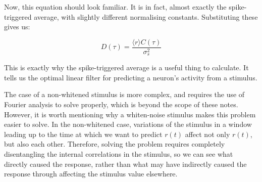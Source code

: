 \documentclass{article}
\begin{document}
Now, this equation should look familiar. It is in fact, almost exactly the spike-triggered average, with slightly different normalising constants. Substituting these gives us:

\begin{equation*}
	D(\tau) = \frac{\langle r \rangle C(\tau)}{\sigma_s^2}
\end{equation*}

This is exactly why the spike-triggered average is a useful thing to calculate. It tells us the optimal linear filter for predicting a neuron's activity from a stimulus.\\

\begin{figure}[H]
	\centering

\end{figure}

The case of a non-whitened stimulus is more complex, and requires the use of Fourier analysis to solve properly, which is beyond the scope of these notes. However, it is worth mentioning why a whiten-noise stimulus makes this problem easier to solve. In the non-whitened case, variations of the stimulus in a window leading up to the time at which we want to predict $r(t)$ affect not only $r(t)$, but also each other. Therefore, solving the problem requires completely disentangling the internal correlations in the stimulus, so we can see what directly caused the response, rather than what may have indirectly caused the response through affecting the stimulus value elsewhere.\\
\end{document}
